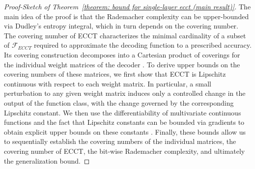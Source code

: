 \documentclass[lettersize,onecolumn]{IEEEtran}
\begin{document}
\begin{proof}[Proof-Sketch of Theorem~\ref{theorem: bound for single-layer ecct (main result)}]
    The main idea of the proof is that the Rademacher complexity can be upper-bounded via Dudley’s entropy integral, which in turn depends on the covering number. The covering number of ECCT characterizes the minimal cardinality of a subset of $\mathcal{F}_{ECCT}$ required to approximate the decoding function to a prescribed accuracy. Its covering construction decomposes into a Cartesian product of coverings for the individual weight matrices of the decoder \cite{chen2020generalizationofafamilyofRNN,edelman2022inductivebiasTransformerGeneralization}. To derive upper bounds on the covering numbers of these matrices, we first show that ECCT is Lipschitz continuous with respect to each weight matrix. In particular, a small perturbation to any given weight matrix induces only a controlled change in the output of the function class, with the change governed by the corresponding Lipschitz constant. We then use the differentiability of multivariate continuous functions \cite[Theorem 3.1.6]{federer2014geometricmeasure} and the fact that Lipschitz constants can be bounded via gradients to obtain explicit upper bounds on these constants \cite{virmaux2018lipschitzConstantEstimation}. Finally, these bounds allow us to sequentially establish the covering numbers of the individual matrices, the covering number of ECCT, the bit-wise Rademacher complexity, and ultimately the generalization bound.
    
        
\end{proof}
\end{document}

